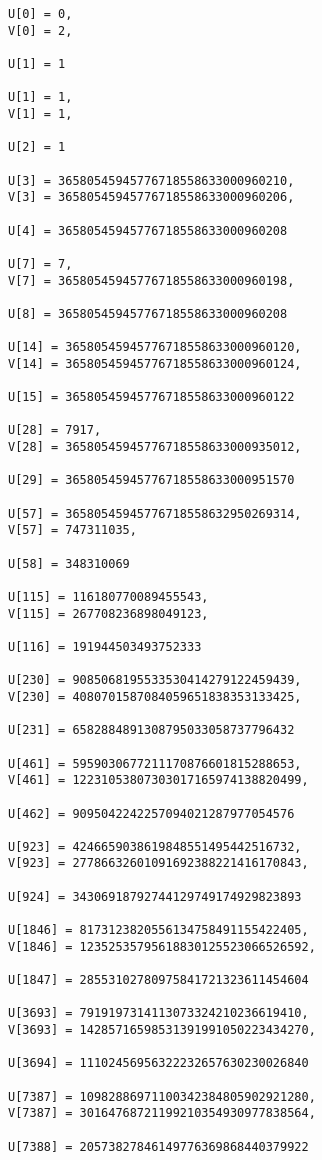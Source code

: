 \documentclass[a4paper]{article}
\begin{document}
\begin{verbatim}
U[0] = 0, 
V[0] = 2, 

U[1] = 1

U[1] = 1, 
V[1] = 1, 

U[2] = 1

U[3] = 36580545945776718558633000960210, 
V[3] = 36580545945776718558633000960206, 

U[4] = 36580545945776718558633000960208

U[7] = 7, 
V[7] = 36580545945776718558633000960198, 

U[8] = 36580545945776718558633000960208

U[14] = 36580545945776718558633000960120, 
V[14] = 36580545945776718558633000960124, 

U[15] = 36580545945776718558633000960122

U[28] = 7917, 
V[28] = 36580545945776718558633000935012, 

U[29] = 36580545945776718558633000951570

U[57] = 36580545945776718558632950269314, 
V[57] = 747311035, 

U[58] = 348310069

U[115] = 116180770089455543, 
V[115] = 267708236898049123, 

U[116] = 191944503493752333

U[230] = 9085068195533530414279122459439, 
V[230] = 4080701587084059651838353133425, 

U[231] = 6582884891308795033058737796432

U[461] = 5959030677211170876601815288653, 
V[461] = 12231053807303017165974138820499, 

U[462] = 9095042242257094021287977054576

U[923] = 4246659038619848551495442516732, 
V[923] = 27786632601091692388221416170843, 

U[924] = 34306918792744129749174929823893

U[1846] = 8173123820556134758491155422405, 
V[1846] = 12352535795618830125523066526592, 

U[1847] = 28553102780975841721323611454604

U[3693] = 7919197314113073324210236619410, 
V[3693] = 14285716598531391991050223434270, 

U[3694] = 11102456956322232657630230026840

U[7387] = 10982886971100342384805902921280, 
V[7387] = 30164768721199210354930977838564, 

U[7388] = 20573827846149776369868440379922


\end{verbatim}
\end{document}
